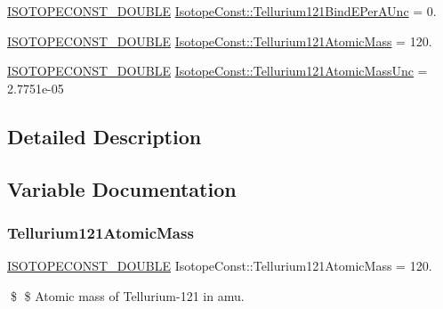 \begin{DoxyCompactItemize}
\mbox{\hyperlink{group___isotope_const-_macros_ga8f45a7272ce02c0b4c65c44636ed719a}{I\+S\+O\+T\+O\+P\+E\+C\+O\+N\+S\+T\+\_\+\+D\+O\+U\+B\+LE}} \mbox{\hyperlink{group___isotope_const-_tellurium-_te121_ga1c66de3b54d9fe15a1110406fb190b0d}{Isotope\+Const\+::\+Tellurium121\+Bind\+E\+Per\+A\+Unc}} = 0.
\item 
\mbox{\hyperlink{group___isotope_const-_macros_ga8f45a7272ce02c0b4c65c44636ed719a}{I\+S\+O\+T\+O\+P\+E\+C\+O\+N\+S\+T\+\_\+\+D\+O\+U\+B\+LE}} \mbox{\hyperlink{group___isotope_const-_tellurium-_te121_ga86b22934df4c384f17d0e31feda1ee67}{Isotope\+Const\+::\+Tellurium121\+Atomic\+Mass}} = 120.
\item 
\mbox{\hyperlink{group___isotope_const-_macros_ga8f45a7272ce02c0b4c65c44636ed719a}{I\+S\+O\+T\+O\+P\+E\+C\+O\+N\+S\+T\+\_\+\+D\+O\+U\+B\+LE}} \mbox{\hyperlink{group___isotope_const-_tellurium-_te121_gadf38d27bff949524d75a64f434421822}{Isotope\+Const\+::\+Tellurium121\+Atomic\+Mass\+Unc}} = 2.\+7751e-\/05
\end{DoxyCompactItemize}


\subsection{Detailed Description}


\subsection{Variable Documentation}
\mbox{\label{group___isotope_const-_tellurium-_te121_ga86b22934df4c384f17d0e31feda1ee67}} 
\subsubsection{\texorpdfstring{Tellurium121\+Atomic\+Mass}{Tellurium121AtomicMass}}
{\footnotesize\ttfamily \mbox{\hyperlink{group___isotope_const-_macros_ga8f45a7272ce02c0b4c65c44636ed719a}{I\+S\+O\+T\+O\+P\+E\+C\+O\+N\+S\+T\+\_\+\+D\+O\+U\+B\+LE}} Isotope\+Const\+::\+Tellurium121\+Atomic\+Mass = 120.}

\$ \$ Atomic mass of Tellurium-\/121 in amu. \mbox{\label{group___isotope_const-_tellurium-_te121_gadf38d27bff949524d75a64f434421822}} 
